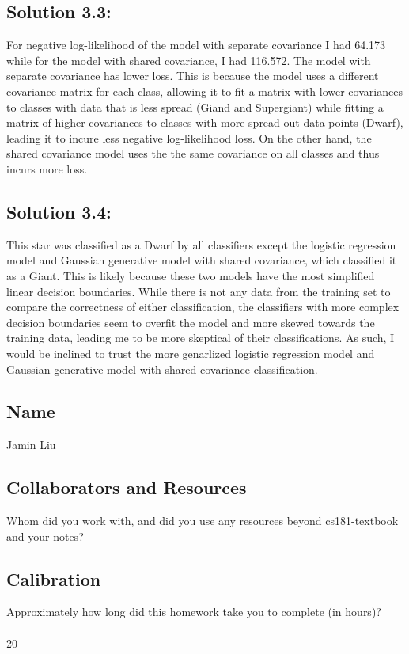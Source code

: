 \documentclass[submit]{harvardml}
\begin{document}
\subsection*{Solution 3.3:}
For negative log-likelihood of the model with separate covariance I had 64.173 while for the model with shared covariance, I had 116.572. The model with separate covariance has lower loss. This is because the model uses a different covariance matrix for each class, allowing it to fit a matrix with lower covariances to classes with data that is less spread (Giand and Supergiant) while fitting a matrix of higher covariances to classes with more spread out data points (Dwarf), leading it to incure less negative log-likelihood loss. On the other hand, the shared covariance model uses the the same covariance on all classes and thus incurs more loss. 
\subsection*{Solution 3.4:}
This star was classified as a Dwarf by all classifiers except the logistic regression model and Gaussian generative model with shared covariance, which classified it as a Giant. This is likely because these two models have the most simplified linear decision boundaries. While there is not any data from the training set to compare the correctness of either classification, the classifiers with more complex decision boundaries seem to overfit the model and more skewed towards the training data, leading me to be more skeptical of their classifications. As such, I would be inclined to trust the more genarlized logistic regression model and Gaussian generative model with shared covariance classification.
\newpage
\subsection*{Name}

Jamin Liu

\subsection*{Collaborators and Resources}
Whom did you work with, and did you use any resources beyond cs181-textbook and your notes?

\subsection*{Calibration}
Approximately how long did this homework take you to complete (in hours)?
\\ \\
20
\end{document}
